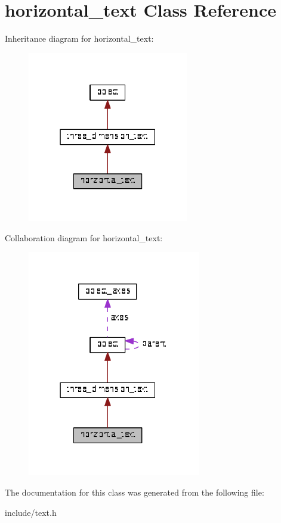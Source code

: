 \hypertarget{classhorizontal__text}{}\section{horizontal\+\_\+text Class Reference}
\label{classhorizontal__text}


Inheritance diagram for horizontal\+\_\+text\+:
\nopagebreak
\begin{figure}[H]
\begin{center}
\leavevmode
\includegraphics[width=199pt]{classhorizontal__text__inherit__graph}
\end{center}
\end{figure}


Collaboration diagram for horizontal\+\_\+text\+:
\nopagebreak
\begin{figure}[H]
\begin{center}
\leavevmode
\includegraphics[width=214pt]{classhorizontal__text__coll__graph}
\end{center}
\end{figure}


The documentation for this class was generated from the following file\+:\begin{DoxyCompactItemize}
\item 
include/text.\+h\end{DoxyCompactItemize}
